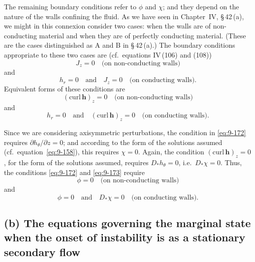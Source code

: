 The remaining boundary conditions refer to $\phi$ and $\chi$; and they depend on the nature of the walls confining the fluid. As we have seen in Chapter~IV, \S\,42\,(a), we might in this connexion consider two cases: when the walls are of non-conducting material and when they are of perfectly conducting material. (These are the cases distinguished as A and B in \S\,42\,(a).) The boundary conditions appropriate to these two cases are (cf.\ equations IV\,(106) and (108))
\begin{equation}
J_z = 0 \quad \text{(on non-conducting walls)} \label{eq:9-170}
\end{equation}
and
\begin{equation}
h_r = 0 \quad \text{and} \quad J_z = 0 \quad \text{(on conducting walls).} \label{eq:9-171}
\end{equation}
Equivalent forms of these conditions are
\begin{equation}
(\mathrm{curl}\,\mathbf{h})_z = 0 \quad \text{(on non-conducting walls)} \label{eq:9-172}
\end{equation}
and
\begin{equation}
h_r = 0 \quad \text{and} \quad (\mathrm{curl}\,\mathbf{h})_z = 0 \quad \text{(on conducting walls).} \label{eq:9-173}
\end{equation}

Since we are considering axisymmetric perturbations, the condition in \eqref{eq:9-172} requires $\partial h_\theta/\partial z = 0$; and according to the form of the solutions assumed (cf.\ equation~\eqref{eq:9-158}), this requires $\chi = 0$. Again, the condition $(\mathrm{curl}\,\mathbf{h})_z = 0$, for the form of the solutions assumed, requires $D_*h_\theta = 0$, i.e.\ $D_*\chi = 0$. Thus, the conditions \eqref{eq:9-172} and \eqref{eq:9-173} require
\begin{equation}
\phi = 0 \quad \text{(on non-conducting walls)} \label{eq:9-174}
\end{equation}
and
\begin{equation}
\phi = 0 \quad \text{and} \quad D_*\chi = 0 \quad \text{(on conducting walls).} \label{eq:9-175}
\end{equation}

\subsection*{(b) The equations governing the marginal state when the onset of instability is as a stationary secondary flow}

